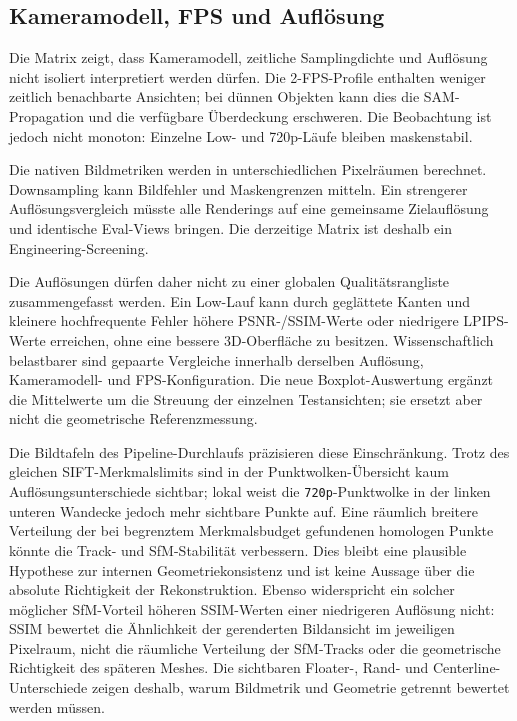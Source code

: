 \subsection{Kameramodell, FPS und Auflösung}

Die Matrix zeigt, dass Kameramodell, zeitliche Samplingdichte und Auflösung
nicht isoliert interpretiert werden dürfen. Die 2-FPS-Profile enthalten weniger
zeitlich benachbarte Ansichten; bei dünnen Objekten kann dies die SAM-
Propagation und die verfügbare Überdeckung erschweren. Die Beobachtung ist
jedoch nicht monoton: Einzelne Low- und 720p-Läufe bleiben maskenstabil.

Die nativen Bildmetriken werden in unterschiedlichen Pixelräumen berechnet.
Downsampling kann Bildfehler und Maskengrenzen mitteln. Ein strengerer
Auflösungsvergleich müsste alle Renderings auf eine gemeinsame Zielauflösung
und identische Eval-Views bringen. Die derzeitige Matrix ist deshalb ein
Engineering-Screening.

Die Auflösungen dürfen daher nicht zu einer globalen Qualitätsrangliste
zusammengefasst werden. Ein Low-Lauf kann durch geglättete Kanten und kleinere
hochfrequente Fehler höhere PSNR-/SSIM-Werte oder niedrigere LPIPS-Werte
erreichen, ohne eine bessere 3D-Oberfläche zu besitzen. Wissenschaftlich
belastbarer sind gepaarte Vergleiche innerhalb derselben Auflösung,
Kameramodell- und FPS-Konfiguration. Die neue Boxplot-Auswertung ergänzt die
Mittelwerte um die Streuung der einzelnen Testansichten; sie ersetzt aber
nicht die geometrische Referenzmessung.

Die Bildtafeln des Pipeline-Durchlaufs präzisieren diese Einschränkung. Trotz
des gleichen SIFT-Merkmalslimits sind in der Punktwolken-Übersicht kaum
Auflösungsunterschiede sichtbar; lokal weist die \texttt{720p}-Punktwolke in
der linken unteren Wandecke jedoch mehr sichtbare Punkte auf. Eine räumlich
breitere Verteilung der bei begrenztem Merkmalsbudget gefundenen homologen
Punkte könnte die Track- und SfM-Stabilität verbessern. Dies bleibt eine
plausible Hypothese zur internen Geometriekonsistenz und ist keine Aussage
über die absolute Richtigkeit der Rekonstruktion. Ebenso widerspricht ein
solcher möglicher SfM-Vorteil höheren SSIM-Werten einer niedrigeren Auflösung
nicht: SSIM bewertet die Ähnlichkeit der gerenderten Bildansicht im jeweiligen
Pixelraum, nicht die räumliche Verteilung der SfM-Tracks oder die geometrische
Richtigkeit des späteren Meshes. Die sichtbaren Floater-, Rand- und
Centerline-Unterschiede zeigen deshalb, warum Bildmetrik und Geometrie getrennt
bewertet werden müssen.

